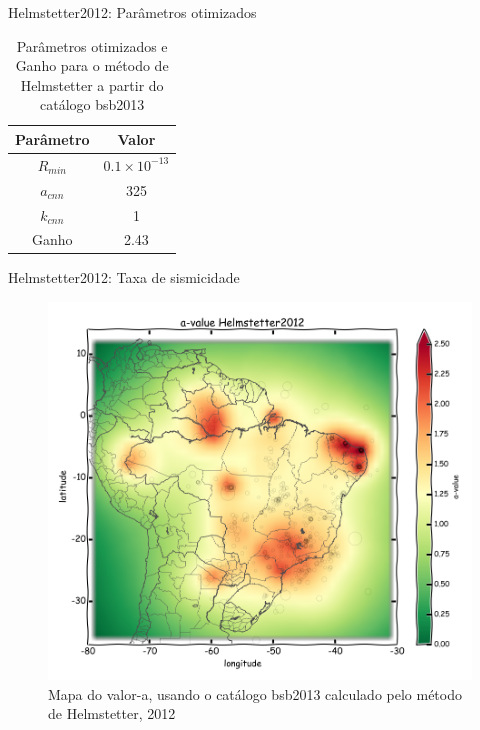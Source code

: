 \documentclass[ucs,8pt]{beamer}
\begin{document}
\begin{frame}{Helmstetter2012: Parâmetros otimizados}
\begin{table}[H]
	\centering
	\begin{tabular}{c|c}
		Parâmetro & Valor \\ \hline
		$R_{min}$ & $0.1\times10^{-13}$ \\
		$a_{cnn}$ & 325 \\
		$k_{cnn}$ & 1 \\ \hline
		Ganho	  & 2.43
	\end{tabular}
	\caption{Parâmetros otimizados e Ganho para o método de Helmstetter a partir do catálogo \gls{bsb2013}}
	\label{tab:hemlstetter}
\end{table}
\end{frame}


\begin{frame}{Helmstetter2012: Taxa de sismicidade}
\begin{figure}[H]
  \centering
  \includegraphics[height=.95\textheight]{a_helmstetter} 
  \caption{Mapa do valor-a, usando o catálogo \gls{bsb2013} calculado pelo método de Helmstetter, 2012 }
  \label{fig:helm_r} 
\end{figure}
\end{frame}
\end{document}
